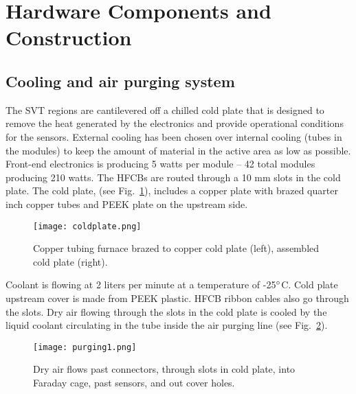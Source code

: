 \section{Hardware Components and Construction}

\subsection{Cooling and air purging system}

The SVT regions are cantilevered off a chilled cold plate that is designed to remove the heat generated by the electronics and provide operational  conditions for the sensors. External cooling has been chosen over internal cooling (tubes in the modules) to keep the amount of material in the active area as low as possible. Front-end electronics is producing 5 watts per module -- 42 total modules producing 210 watts. The HFCBs are routed through a 10 mm slots in the cold plate. The cold plate, (see Fig.~\ref{fig:coldplate}), includes a copper plate with brazed quarter inch copper tubes and PEEK plate on the upstream side. 

\begin{figure}[hbt] 
\centering 
\texttt{[image: coldplate.png]}
\caption{Copper tubing furnace brazed to copper cold plate (left), assembled cold plate (right).}
\label{fig:coldplate}
\end{figure}


Coolant is flowing at 2 liters per minute at a temperature of -25$\degree$C. Cold plate upstream cover is made from PEEK plastic. HFCB ribbon cables also go through the slots. Dry air flowing through the slots in the cold plate is cooled by the liquid coolant circulating in the tube inside the air purging line (see Fig.~\ref{fig:purging1}). 

\begin{figure}[hbt] 
\centering 
\texttt{[image: purging1.png]}
\caption{Dry air flows past connectors, through slots in cold plate, into Faraday cage, past sensors, and out cover holes.}
\label{fig:purging1}
\end{figure}

